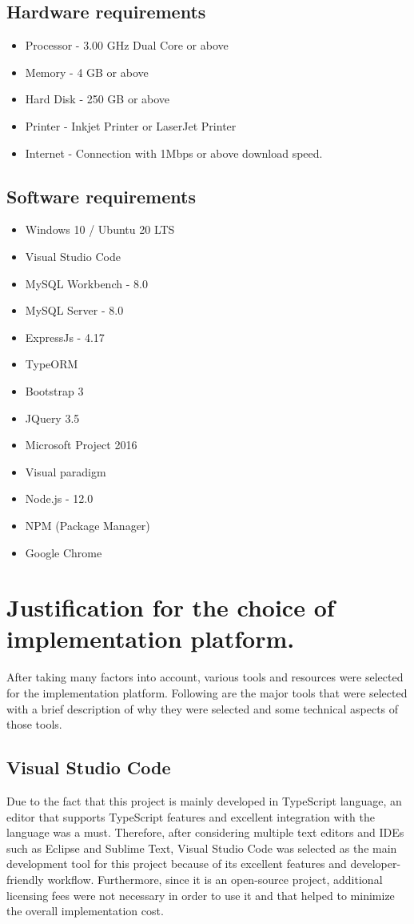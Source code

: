 \documentclass[12pt]{report}
\begin{document}
\subsection{Hardware requirements}
\begin{itemize}
	\item Processor - 3.00 GHz Dual Core or above
	\item Memory - 4 GB or above
	\item Hard Disk - 250 GB or above
	\item Printer - Inkjet Printer or LaserJet Printer
	\item Internet - Connection with 1Mbps or above download speed.
\end{itemize}

\subsection{Software requirements}
\begin{itemize}
	\item Windows 10 / Ubuntu 20 LTS
	\item Visual Studio Code
	\item MySQL Workbench - 8.0
	\item MySQL Server - 8.0
	\item ExpressJs - 4.17
	\item TypeORM
	\item Bootstrap 3
	\item JQuery 3.5
	\item Microsoft Project 2016
	\item Visual paradigm
	\item Node.js - 12.0
	\item NPM (Package Manager)
	\item Google Chrome
\end{itemize}

\section{Justification for the choice of implementation platform.}
After taking many factors into account, various tools and resources were selected for the implementation platform. Following are the major tools that were selected with a brief description of why they were selected and some technical aspects of those tools.

\subsection{Visual Studio Code}
Due to the fact that this project is mainly developed in TypeScript language, an editor that supports TypeScript features and excellent integration with the language was a must. Therefore, after considering multiple text editors and IDEs such as Eclipse and Sublime Text, Visual Studio Code was selected as the main development tool for this project because of its excellent features and developer-friendly workflow. Furthermore, since it is an open-source project, additional licensing fees were not necessary in order to use it and that helped to minimize the overall implementation cost.
\end{document}
